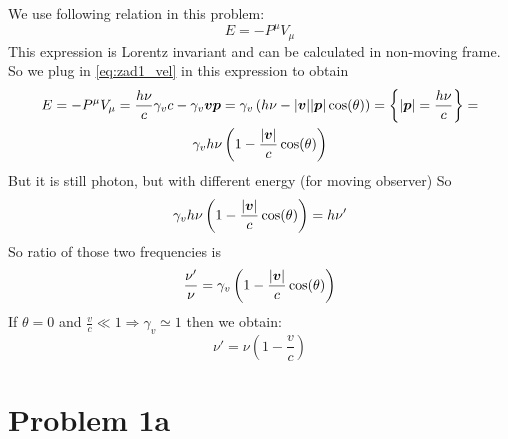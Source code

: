 We use following relation in this problem:
%
\begin{equation}
    E = -P^\mu V_\mu
\end{equation}
%
This expression is Lorentz invariant and can be calculated in non-moving frame.
So we plug in \autoref{eq:zad1_vel} in this expression to obtain
%
\begin{multline}
    E = -P^\mu V_\mu = \frac{h\nu}{c}\gamma_v c - \gamma_v \boldsymbol{v}\boldsymbol{p} = 
    \gamma_v\left(h\nu - |\boldsymbol{v}||\boldsymbol{p}|\cos(\theta)\right) = 
    \left\{|\boldsymbol{p}| = \frac{h\nu}{c}\right\} =\\
    \gamma_vh\nu\left(1-\frac{|\boldsymbol{v}|}{c}\cos(\theta)\right)
\end{multline}
%
But it is still photon, but with different energy (for moving observer) So
%
\begin{equation}
    \gamma_vh\nu\left(1-\frac{|\boldsymbol{v}|}{c}\cos(\theta)\right) = h\nu'
\end{equation}
%
So ratio of those two frequencies is
%
\begin{equation}
    \frac{\nu'}{\nu} = \gamma_v\left(1-\frac{|\boldsymbol{v}|}{c}\cos(\theta)\right)
\end{equation}
%
If $\theta = 0$ and $\frac{v}{c} \ll 1 \Rightarrow \gamma_v \simeq 1$ then we
obtain:
%
\begin{equation}
    \boxed{\nu' = \nu \left(1-\frac{v}{c}\right)}
\end{equation}

\newpage


\section*{Problem 1a}

